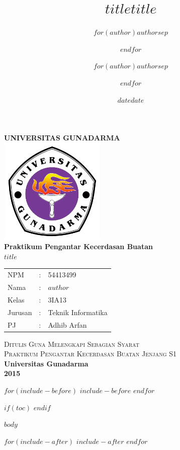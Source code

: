 \documentclass[a4,11pt]{$documentclass$}
\title{$title$}
\author{$for(author)$$author$$sep$ \and $endfor$}
\date{$date$}
\title{$title$}
\author{$for(author)$$author$$sep$ \and $endfor$}
\date{$date$}
\begin{document}
\begin{titlepage}


    \begin{center}

        { \huge \bfseries UNIVERSITAS GUNADARMA}\\[1cm]

        \includegraphics[width=2in, height=2in]{./gambar/logo}\\[1cm]

        { \Large \bfseries Praktikum Pengantar Kecerdasan Buatan}\\[0.5cm]
        { \Large \bfseries $title$} \\[1cm]

        \begin{framed}

          \begin{tabular}{ l c l }
            NPM & : & 54413499 \\
            Nama  & : & {$author$} \\
            Kelas & : & 3IA13 \\
            Jurusan & : & Teknik Informatika \\
            PJ & : & Adhib Arfan \\
          \end{tabular}

        \end{framed}

        \textsc{\Large \normalfont Ditulis Guna Melengkapi Sebagian Syarat}\\[0.5cm]
        \textsc{\Large \normalfont Praktikum Pengantar Kecerdasan Buatan Jenjang S1}\\[0.5cm]
        {\LARGE \bfseries Universitas Gunadarma}\\[0.5cm]
        {\LARGE \bfseries 2015}\\[0.5cm]

        \vfill

    \end{center}

\end{titlepage}

$for(include-before)$
    $include-before$
$endfor$

$if(toc)$
{
    \hypersetup{linkcolor=black}
    \tableofcontents
}
$endif$

\newpage
{}

$body$


$for(include-after)$
    $include-after$
$endfor$
\end{document}
